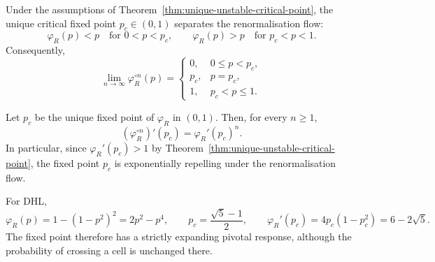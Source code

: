 \begin{corollary}
\label{cor:global-renormalisation-dichotomy}
Under the assumptions of Theorem~\ref{thm:unique-unstable-critical-point},
the unique critical fixed point \(p_c\in(0,1)\) separates the renormalisation
flow:
\[
    \varphi_R(p)<p
    \quad\text{for }0<p<p_c,
    \qquad
    \varphi_R(p)>p
    \quad\text{for }p_c<p<1.
\]
Consequently,
\[
    \displaystyle\lim_{n\to\infty}\varphi_R^{\circ n}(p)
    =
    \begin{cases}
        0, & 0\le p<p_c,\\[2mm]
        p_c, & p=p_c,\\[2mm]
        1, & p_c<p\le 1.
    \end{cases}
\]
\end{corollary}



\begin{corollary}
\label{cor:iterated-linearisation}
Let \(p_c\) be the unique fixed point of \(\varphi_R\) in \((0,1)\).
Then, for every \(n\ge 1\),
\[
    \left(\varphi_R^{\circ n}\right)'(p_c)
    =
    \varphi_R'(p_c)^n.
\]
In particular, since \(\varphi_R'(p_c)>1\) by Theorem~\ref{thm:unique-unstable-critical-point}, the fixed point \(p_c\) is exponentially
repelling under the renormalisation flow.
\end{corollary}




\begin{example}\label{ex:dhl-reliability}
For DHL,
\[
 \varphi_R(p)=1-(1-p^2)^2=2p^2-p^4,\qquad
 p_c=\frac{\sqrt5-1}{2},\qquad
 \varphi_R'(p_c)=4p_c(1-p_c^2)=6-2\sqrt5.
\]
The fixed point therefore has a strictly expanding pivotal response, although the probability of crossing a cell is unchanged there.
\end{example}

